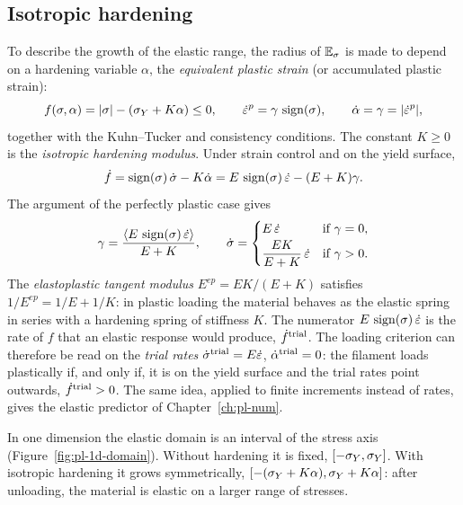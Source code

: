 \subsection{Isotropic hardening}\label{ssec:pl-1d-iso}
%
To describe the growth of the elastic range, the radius of $\mathbb{E}_{\sigma}$ is made to
depend on a hardening variable $\alpha$, the \emph{equivalent plastic strain}
(or accumulated plastic strain):
\begin{equation}\label{eq:pl-1d-iso}
  f(\sigma,\alpha)=|\sigma|-(\sigma_{Y}+K\alpha)\le0,\qquad
  \dot\varepsilon^p=\gamma\,\operatorname{sign}(\sigma),\qquad \dot\alpha=\gamma=|\dot\varepsilon^p|,
\end{equation}
together with the Kuhn--Tucker and consistency conditions. The constant
$K\ge0$ is the \emph{isotropic hardening modulus}. Under strain control and
on the yield surface,
\[
  \dot f=\operatorname{sign}(\sigma)\,\dot\sigma-K\dot\alpha
  =E\,\operatorname{sign}(\sigma)\,\dot\varepsilon-(E+K)\gamma .
\]
The argument of the perfectly plastic case gives
\begin{equation}\label{eq:pl-1d-gamma-iso}
  \gamma=\frac{\langle E\,\operatorname{sign}(\sigma)\,\dot\varepsilon\rangle}{E+K},\qquad
  \dot\sigma=\begin{cases}E\,\dot\varepsilon & \text{if }\gamma=0,\\[2pt]
  \displaystyle\frac{EK}{E+K}\,\dot\varepsilon & \text{if }\gamma>0.\end{cases}
\end{equation}
The \emph{elastoplastic tangent modulus} $E^{ep}=EK/(E+K)$ satisfies
$1/E^{ep}=1/E+1/K$: in plastic loading the material behaves as the elastic
spring in series with a hardening spring of stiffness $K$.
The numerator $E\,\operatorname{sign}(\sigma)\,\dot\varepsilon$ is the rate of $f$ that an
elastic response would produce, $\dot f^{\mathrm{trial}}$. The loading criterion can
therefore be read on the \emph{trial rates}
$\dot\sigma^{\mathrm{trial}}=E\dot\varepsilon$, $\dot\alpha^{\mathrm{trial}}=0$: the filament
loads plastically if, and only if, it is on the yield surface and the trial
rates point outwards, $\dot f^{\mathrm{trial}}>0$. The same idea, applied to finite
increments instead of rates, gives the elastic predictor of
Chapter~\ref{ch:pl-num}.

In one dimension the elastic domain is an interval of the stress axis
(Figure~\ref{fig:pl-1d-domain}). Without hardening it is fixed,
$[-\sigma_{Y},\sigma_{Y}]$. With isotropic hardening it grows symmetrically,
$[-(\sigma_{Y}+K\alpha),\sigma_{Y}+K\alpha]$: after unloading, the material is elastic on a
larger range of stresses.

